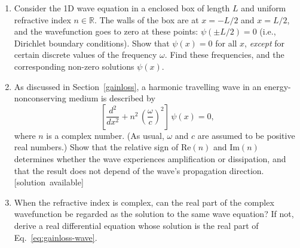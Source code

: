 \documentclass[10pt,a4paper]{article}
\begin{document}
\begin{enumerate}
\item
  Consider the 1D wave equation in a enclosed box of length $L$ and
  uniform refractive index $n\in\mathbb{R}$. The walls of the box are
  at $x = -L/2$ and $x = L/2$, and the wavefunction goes to zero at
  these points: $\psi(\pm L/2) = 0$ (i.e., Dirichlet boundary
  conditions). Show that $\psi(x) = 0$ for all $x$, \emph{except}
  for certain discrete values of the frequency $\omega$. Find these
  frequencies, and the corresponding non-zero solutions $\psi(x)$.

\item
  As discussed in Section~\ref{gainloss}, a harmonic travelling wave
  in an energy-nonconserving medium is described by
  \begin{equation}
    \left[\frac{d^2}{d x^2} + n^2\, \left(\frac{\omega}{c}\right)^2\right] \, \psi(x) = 0,
  \end{equation}
  where $n$ is a complex number. (As usual, $\omega$ and $c$ are
  assumed to be positive real numbers.) Show that the relative sign of
  $\mathrm{Re}(n)$ and $\mathrm{Im}(n)$ determines whether the wave
  experiences amplification or dissipation, and that the result does
  not depend of the wave's propagation direction.
  \hfill{\scriptsize [solution~available]}

\item
  When the refractive index is complex, can the real part of the
  complex wavefunction be regarded as the solution to the same wave
  equation? If not, derive a real differential equation whose solution
  is the real part of Eq.~\eqref{eq:gainloss-wave}.
\end{enumerate}

    
\end{document}
